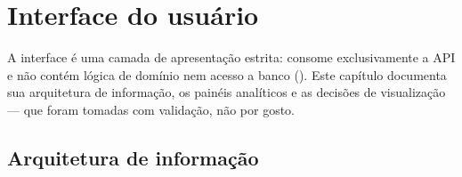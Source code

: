 \chapter{Interface do usuário}
\label{cap:interface}

A interface é uma camada de apresentação estrita: consome exclusivamente a API
e não contém lógica de domínio nem acesso a banco (). Este capítulo
documenta sua arquitetura de informação, os painéis analíticos e as decisões de
visualização --- que foram tomadas com validação, não por gosto.

\section{Arquitetura de informação}

